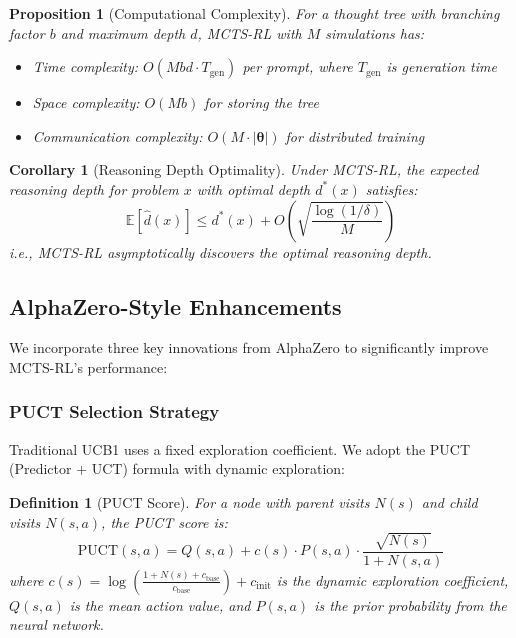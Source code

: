 \documentclass[11pt,a4paper]{article}
\newtheorem{proposition}[theorem]{Proposition}
\newtheorem{corollary}[theorem]{Corollary}
\newtheorem{definition}[theorem]{Definition}
\newcommand{\E}{\mathbb{E}}
\newcommand{\btheta}{\bm{\theta}}
\begin{document}
\begin{proposition}[Computational Complexity]
\label{prop:mcts_comp}
For a thought tree with branching factor $b$ and maximum depth $d$, MCTS-RL with $M$ simulations has:
\begin{itemize}
    \item Time complexity: $O(Mbd \cdot T_{\text{gen}})$ per prompt, where $T_{\text{gen}}$ is generation time
    \item Space complexity: $O(Mb)$ for storing the tree
    \item Communication complexity: $O(M \cdot |\btheta|)$ for distributed training
\end{itemize}
\end{proposition}

\begin{corollary}[Reasoning Depth Optimality]
Under MCTS-RL, the expected reasoning depth for problem $x$ with optimal depth $d^*(x)$ satisfies:
\begin{equation}
    \E[\hat{d}(x)] \leq d^*(x) + O\left(\sqrt{\frac{\log(1/\delta)}{M}}\right)
\end{equation}
i.e., MCTS-RL asymptotically discovers the optimal reasoning depth.
\end{corollary}

\subsection{AlphaZero-Style Enhancements}

We incorporate three key innovations from AlphaZero \cite{silver2017alphazero} to significantly improve MCTS-RL's performance:

\subsubsection{PUCT Selection Strategy}

Traditional UCB1 uses a fixed exploration coefficient. We adopt the PUCT (Predictor + UCT) formula with dynamic exploration:

\begin{definition}[PUCT Score]
For a node with parent visits $N(s)$ and child visits $N(s,a)$, the PUCT score is:
\begin{equation}
    \text{PUCT}(s,a) = Q(s,a) + c(s) \cdot P(s,a) \cdot \frac{\sqrt{N(s)}}{1 + N(s,a)}
\end{equation}
where $c(s) = \log\left(\frac{1 + N(s) + c_{\text{base}}}{c_{\text{base}}}\right) + c_{\text{init}}$ is the dynamic exploration coefficient, $Q(s,a)$ is the mean action value, and $P(s,a)$ is the prior probability from the neural network.
\end{definition}
\end{document}
